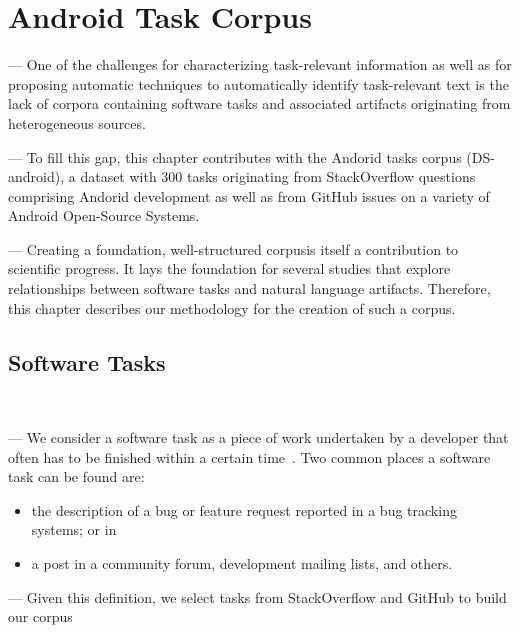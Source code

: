 \setcounter{chapter}{3}
\setcounter{rq}{1}


\chapter{Android Task Corpus}
\label{ch:identifying}



\vspace{1mm}

--- One of the challenges for characterizing task-relevant information as well as for proposing automatic techniques to automatically identify task-relevant text is 
the lack of corpora containing 
software tasks and associated artifacts originating from heterogeneous sources.


--- To fill this gap, this chapter contributes with the Andorid tasks corpus (\acs{DS-android}), a dataset with 300 tasks originating from StackOverflow questions comprising Andorid development
as well as from GitHub issues on a variety of Android Open-Source Systems. 



--- Creating a foundation, well-structured corpusis itself a contribution to scientific progress. It lays the foundation 
for several studies that explore relationships between software tasks and natural language artifacts. Therefore, this chapter describes our methodology for the creation of such a corpus.



\section{Software Tasks}
\textcolor{white}{force ident} %

--- We consider a software task as a piece of work undertaken by a developer that often has to be finished within a certain time~\cite{2004merriam}. 
Two common places a software task can be found are:

\begin{itemize}
    \item the description of a bug or feature request reported in a bug tracking systems; or in
    \item a post in a community forum, development mailing lists, and others.
\end{itemize}

\vspace{3mm}

--- Given this definition, we select tasks from StackOverflow and GitHub to build our corpus

